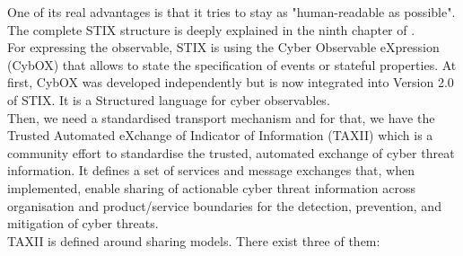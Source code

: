 \documentclass{eplmastersthesis}
\begin{document}
 One of its real advantages is that it tries to stay as "human-readable as possible". The complete STIX structure is deeply explained in the ninth chapter of \cite{barnum2012standardizing}.\\
 For expressing the observable, STIX is using the Cyber Observable eXpression (CybOX)\cite{barnum2012cybox} that allows to state the specification of events or stateful properties. At first, CybOX was developed independently but is now integrated into Version 2.0 of STIX. It is a Structured language for cyber observables.\\
Then, we need a standardised transport mechanism and for that, we have the Trusted Automated eXchange of Indicator of Information (TAXII) \cite{connolly2014trusted, TAXIIProjectWeb} which is a community effort to standardise the trusted, automated exchange of cyber threat information. It defines a set of services and message exchanges that, when implemented, enable sharing of actionable cyber threat information across organisation and product/service boundaries for the detection, prevention, and mitigation of cyber threats.\\
TAXII is defined around sharing models. There exist three of them:
\end{document}
